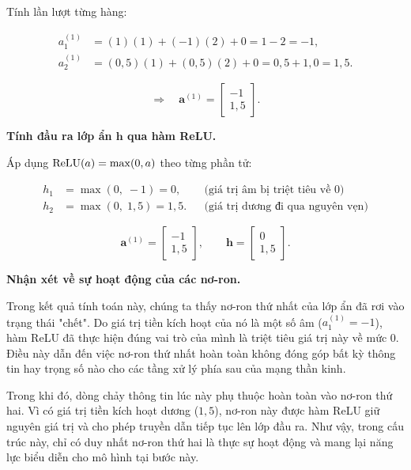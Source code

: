 \documentclass[12pt,a4paper]{article}
\begin{document}
Tính lần lượt từng hàng:

\[
  \begin{aligned}
    a^{(1)}_1 &= (1)(1) + (-1)(2) + 0 = 1 - 2 = -1,\\[4pt]
    a^{(1)}_2 &= (0{,}5)(1) + (0{,}5)(2) + 0 = 0{,}5 + 1{,}0 = 1{,}5.
  \end{aligned}
\]

\[
  \Rightarrow\quad
  \mathbf{a}^{(1)} = \begin{bmatrix} -1 \\ 1{,}5 \end{bmatrix}.
\]

\medskip
\noindent\textbf{Tính đầu ra lớp ẩn $\mathbf{h}$ qua hàm ReLU.}

Áp dụng $\operatorname{ReLU}(a) = \max(0, a)$ theo từng phần tử:

\[
  \begin{aligned}
    h_1 &= \max(0,\; -1)  = 0,
      &&\text{(giá trị âm bị triệt tiêu về $0$)}\\[4pt]
    h_2 &= \max(0,\; 1{,}5) = 1{,}5.
      &&\text{(giá trị dương đi qua nguyên vẹn)}
  \end{aligned}
\]

\begin{ketqua}
\[
  \mathbf{a}^{(1)} = \begin{bmatrix} -1 \\ 1{,}5 \end{bmatrix}, \qquad
  \mathbf{h} = \begin{bmatrix} 0 \\ 1{,}5 \end{bmatrix}.
\]
\end{ketqua}

\textbf{Nhận xét về sự hoạt động của các nơ-ron.}

Trong kết quả tính toán này, chúng ta thấy nơ-ron thứ nhất của lớp ẩn đã rơi vào trạng thái "chết". Do giá trị tiền kích hoạt của nó là một số âm ($a_1^{(1)} = -1$), hàm ReLU đã thực hiện đúng vai trò của mình là triệt tiêu giá trị này về mức $0$. Điều này dẫn đến việc nơ-ron thứ nhất hoàn toàn không đóng góp bất kỳ thông tin hay trọng số nào cho các tầng xử lý phía sau của mạng thần kinh. 

Trong khi đó, dòng chảy thông tin lúc này phụ thuộc hoàn toàn vào nơ-ron thứ hai. Vì có giá trị tiền kích hoạt dương ($1,5$), nơ-ron này được hàm ReLU giữ nguyên giá trị và cho phép truyền dẫn tiếp tục lên lớp đầu ra. Như vậy, trong cấu trúc này, chỉ có duy nhất nơ-ron thứ hai là thực sự hoạt động và mang lại năng lực biểu diễn cho mô hình tại bước này.
\end{document}
